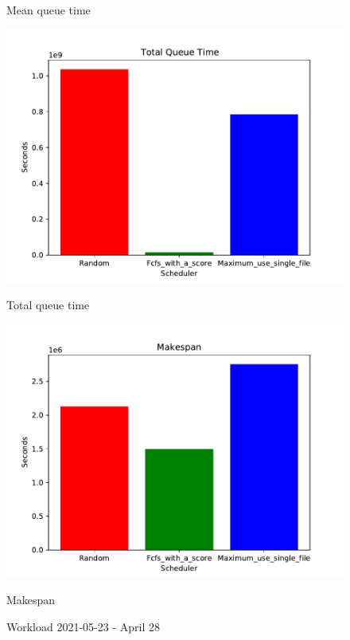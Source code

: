 \documentclass[a4paper]{article}
\begin{document}
\begin{figure}[H]
\begin{minipage}[b]{0.5\linewidth}
    \caption{Mean queue time} 
    \vspace{4ex}
  \end{minipage} 
  \begin{minipage}[b]{0.5\linewidth}
    \centering
    \includegraphics[width=1.11\linewidth]{MBSS/plot/2021-05-23_Total_queue_time.pdf} 
    \caption{Total queue time} 
    \vspace{4ex}
  \end{minipage}%
  \begin{minipage}[b]{0.5\linewidth}
    \centering
    \includegraphics[width=1.11\linewidth]{MBSS/plot/2021-05-23_Makespan.pdf} 
    \caption{Makespan} 
    \vspace{4ex}
  \end{minipage} 
  \caption{Workload 2021-05-23 - April 28}
\end{figure}
\end{document}

